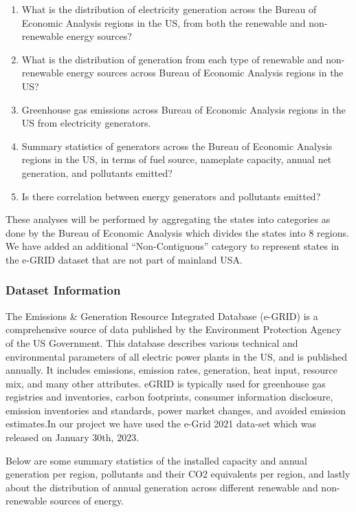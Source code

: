 \documentclass[
]{article}
\providecommand{\tightlist}{%
  \setlength{\itemsep}{0pt}\setlength{\parskip}{0pt}}
\begin{document}
\begin{enumerate}
\def\labelenumi{\arabic{enumi}.}
\tightlist
\item
  What is the distribution of electricity generation across the Bureau
  of Economic Analysis regions in the US, from both the renewable and
  non-renewable energy sources?
\item
  What is the distribution of generation from each type of renewable and
  non-renewable energy sources across Bureau of Economic Analysis
  regions in the US?
\item
  Greenhouse gas emissions across Bureau of Economic Analysis regions in
  the US from electricity generators.
\item
  Summary statistics of generators across the Bureau of Economic
  Analysis regions in the US, in terms of fuel source, nameplate
  capacity, annual net generation, and pollutants emitted?
\item
  Is there correlation between energy generators and pollutants emitted?
\end{enumerate}

These analyses will be performed by aggregating the states into
categories as done by the Bureau of Economic Analysis which divides the
states into 8 regions. We have added an additional ``Non-Contiguous''
category to represent states in the e-GRID dataset that are not part of
mainland USA.

\newpage

\hypertarget{dataset-information}{%
\subsubsection{Dataset Information}\label{dataset-information}}

The Emissions \& Generation Resource Integrated Database (e-GRID) is a
comprehensive source of data published by the Environment Protection
Agency of the US Government. This database describes various technical
and environmental parameters of all electric power plants in the US, and
is published annually. It includes emissions, emission rates,
generation, heat input, resource mix, and many other attributes. eGRID
is typically used for greenhouse gas registries and inventories, carbon
footprints, consumer information disclosure, emission inventories and
standards, power market changes, and avoided emission estimates.In our
project we have used the e-Grid 2021 data-set which was released on
January 30th, 2023.

Below are some summary statistics of the installed capacity and annual
generation per region, pollutants and their CO2 equivalents per region,
and lastly about the distribution of annual generation across different
renewable and non-renewable sources of energy.
\end{document}
